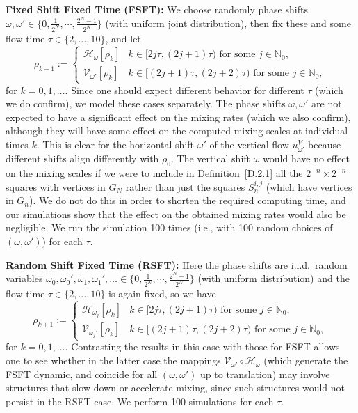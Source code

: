 \documentclass[12pt]{article}
\numberwithin{figure}{section}
\numberwithin{equation}{section}
\newcommand{\bbN}{{\mathbb{N}}}
\newcommand{\calH}{{\mathcal{H}}}
\newcommand{\calV}{{\mathcal{V}}}
\begin{document}
\medskip\noindent
\textbf{Fixed Shift Fixed Time (FSFT):} 
We choose randomly phase shifts $\omega,\omega'\in\{0,\frac 1{2^{N}},\cdots,\frac{2^N-1}{2^{N}}\}$ (with uniform joint distribution), then fix these and some flow time $\tau\in\{2,\dots,10\}$, and  let 
\[
\rho_{k+1}:=
\begin{cases}
\calH_{\omega}[\rho_k] & k\in [2j\tau,(2j+1)\tau) \text{ for some $j\in\bbN_0$}, 
\\ \calV_{\omega'}[\rho_k] & k\in [(2j+1)\tau,(2j+2)\tau) \text{ for some $j\in\bbN_0$}, 
\end{cases}
\]
for $k=0,1,\dots$.
 Since one should expect different behavior for different  $\tau$ (which we do confirm), we model these cases  separately.  The phase shifts $\omega,\omega'$ are not expected to have a significant effect on the mixing rates (which we also confirm), although they will have some effect on the computed mixing scales at individual times $k$.  This is clear for the horizontal shift $\omega'$ of the vertical  flow $u^V_{\omega'}$ because different shifts align differently with $\rho_0$.  The vertical shift $\omega$ would have no effect on the mixing scales if we were to  include in Definition~\ref{D.2.1} all the $2^{-n}\times 2^{-n}$ squares with vertices in $G_N$ rather than just the squares $S_n^{i,j}$ (which have vertices in $G_n$).  We do not do this in order to shorten the required computing time, and our simulations show that the effect on the obtained mixing rates would also be negligible.  We run the simulation 100 times (i.e., with 100 random choices of $(\omega,\omega')$) for each $\tau$.
 
\medskip\noindent
\textbf{Random Shift Fixed Time (RSFT):} 
Here the phase shifts are i.i.d.~random variables $\omega_0,\omega_0', \omega_1,\omega_1',\dots \in\{0,\frac 1{2^{N}},\cdots,\frac{2^N-1}{2^{N}}\}$ (with uniform distribution) and the flow time $\tau\in\{2,\dots,10\}$ is again fixed, so we have
\[
\rho_{k+1}:=
\begin{cases}
\calH_{\omega_j}[\rho_k] & k\in [2j\tau,(2j+1)\tau) \text{ for some $j\in\bbN_0$}, 
\\ \calV_{\omega_j'}[\rho_k] & k\in [(2j+1)\tau,(2j+2)\tau) \text{ for some $j\in\bbN_0$}, 
\end{cases}
\]
for $k=0,1,\dots$.  Contrasting the results in this case with those for FSFT allows one to see whether in the latter case the mappings $\calV_{\omega'}\circ\calH_{\omega}$ (which generate the FSFT dynamic, and coincide for all $(\omega,\omega')$ up to translation) may involve structures that slow down or accelerate mixing, since such structures would not persist in the RSFT case. We perform 100 simulations for each $\tau$.
 
\end{document}
